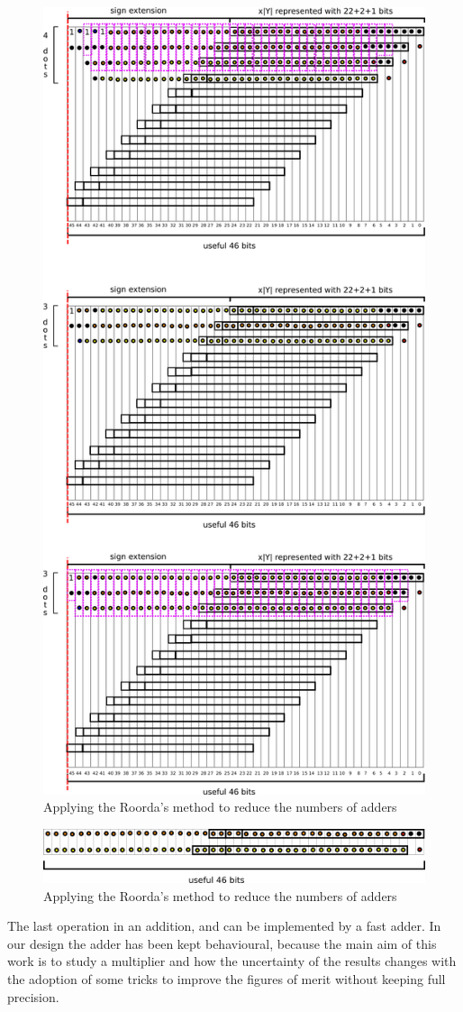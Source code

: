 \documentclass[a4paper]{article}
\begin{document}
	\begin{figure}[hbtp]
	\centering
	\includegraphics[width=.6\linewidth]{media/v1_FA_dadda_bindings_1.png}
	\caption{Applying the Roorda's method to reduce the numbers of adders}
	\label{fig:v1-bind1}
	\end{figure}

	\begin{figure}[hbtp]
	\centering
	\includegraphics[width=.6\linewidth]{media/v1_FA_dadda_bindings_0.png}
	\caption{Applying the Roorda's method to reduce the numbers of adders}
	\label{fig:v1-bind0}
	\end{figure}

	The last operation in an addition, and can be implemented by a fast adder. In our design the adder has been kept behavioural, because the main aim of this work is to study a multiplier and how the uncertainty of the results changes with the adoption of some tricks to improve the figures of merit without keeping full precision.
\end{document}
